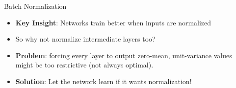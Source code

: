 \documentclass[10pt]{beamer}
\theoremstyle{remark}
\theoremstyle{definition}
\begin{document}






\begin{frame}{Batch Normalization}
    \begin{itemize}
        \item \textbf{Key Insight}: Networks train better when inputs are normalized
        \item So why not normalize intermediate layers too?
        \item \textbf{Problem}: forcing every layer to output zero-mean, unit-variance values might be too restrictive (not always optimal).
        \item \textbf{Solution}: Let the network learn if it wants normalization!
    \end{itemize}
\end{frame}
\end{document}
